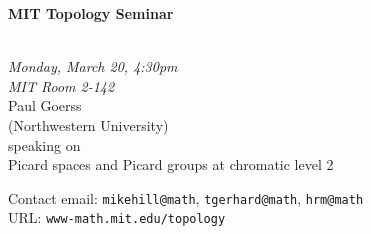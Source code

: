 \documentclass{slides}
\begin{document}
\begin{center}

{\fontsize {54pt}{40pt}\selectfont

\textrm{
{\textbf{MIT Topology Seminar}}}
}\\
\vspace{1cm}
{\large\textrm{\emph{Monday, March 20, 4:30pm\\MIT Room 2-142}}}\\
\vspace{1cm}
\textrm{{\LARGE Paul Goerss  \\[.5cm](Northwestern University)}}\\
\vspace{1cm} %
\textrm{speaking on}\\ %
\vspace{5mm}
\textrm{{\LARGE Picard spaces and Picard groups at chromatic level 2}}\\
\end{center}
\vspace{1cm}
{\small

\textrm{Contact email: } \texttt{mikehill@math}, \texttt{tgerhard@math},
\texttt{hrm@math}\\
\textrm{URL: } \texttt{www-math.mit.edu/topology}
}
\end{document}
